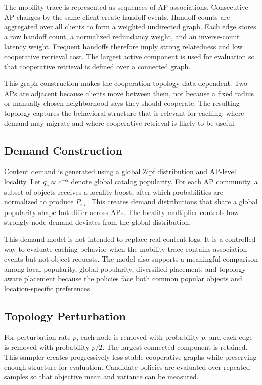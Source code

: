 The mobility trace is represented as sequences of AP associations. Consecutive AP changes by the same client create handoff events. Handoff counts are aggregated over all clients to form a weighted undirected graph. Each edge stores a raw handoff count, a normalized redundancy weight, and an inverse-count latency weight. Frequent handoffs therefore imply strong relatedness and low cooperative retrieval cost. The largest active component is used for evaluation so that cooperative retrieval is defined over a connected graph.

This graph construction makes the cooperation topology data-dependent. Two APs are adjacent because clients move between them, not because a fixed radius or manually chosen neighborhood says they should cooperate. The resulting topology captures the behavioral structure that is relevant for caching: where demand may migrate and where cooperative retrieval is likely to be useful.

\subsection{Demand Construction}

Content demand is generated using a global Zipf distribution and AP-level locality. Let \(q_c\propto c^{-\alpha}\) denote global catalog popularity. For each AP community, a subset of objects receives a locality boost, after which probabilities are normalized to produce \(P_{i,c}\). This creates demand distributions that share a global popularity shape but differ across APs. The locality multiplier controls how strongly node demand deviates from the global distribution.

This demand model is not intended to replace real content logs. It is a controlled way to evaluate caching behavior when the mobility trace contains association events but not object requests. The model also supports a meaningful comparison among local popularity, global popularity, diversified placement, and topology-aware placement because the policies face both common popular objects and location-specific preferences.

\subsection{Topology Perturbation}

For perturbation rate \(p\), each node is removed with probability \(p\), and each edge is removed with probability \(p/2\). The largest connected component is retained. This sampler creates progressively less stable cooperative graphs while preserving enough structure for evaluation. Candidate policies are evaluated over repeated samples so that objective mean and variance can be measured.

